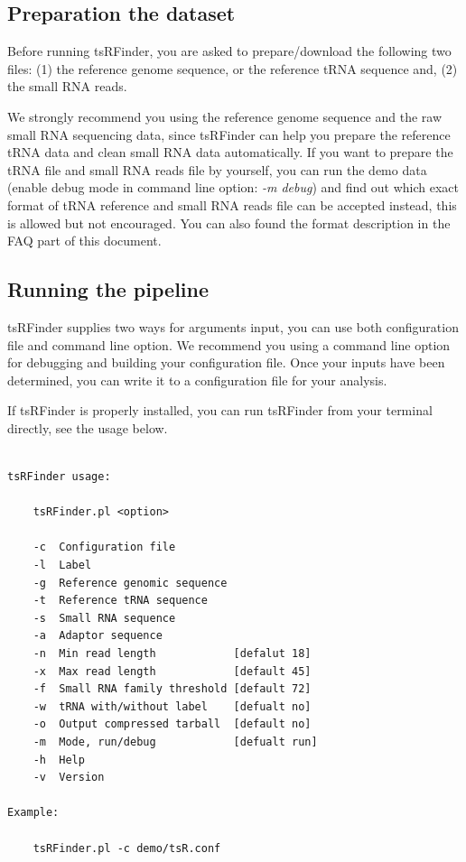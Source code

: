 \documentclass[11pt, a4paper]{article}
\begin{document}
\subsection{Preparation the dataset}

Before running tsRFinder, you are asked to prepare/download the following two files: (1) the reference genome sequence, or the reference tRNA sequence and, (2) the small RNA reads.

We strongly recommend you using the reference genome sequence and the raw small RNA sequencing data, since tsRFinder can help you prepare the reference tRNA data and clean small RNA data automatically. If you want to prepare the tRNA file and small RNA reads file by yourself, you can run the demo data (enable debug mode in command line option: \emph{-m debug}) and find out which exact format of tRNA reference and small RNA reads file can be accepted instead, this is allowed but not encouraged. You can also found the format description in the FAQ part of this document.

\subsection{Running the pipeline}

tsRFinder supplies two ways for arguments input, you can use both configuration file and command line option. We recommend you using a command line option for debugging and building your configuration file. Once your inputs have been determined, you can write it to a configuration file for your analysis.

If tsRFinder is properly installed, you can run tsRFinder from your terminal directly, see the usage below.

{\footnotesize \begin{tcolorbox}[colback=blue!5!white,colframe=blue!75!black,title=Usage of tsRFinder: ./tsRFinder.pl -h]
\begin{verbatim}

tsRFinder usage:

    tsRFinder.pl <option>

    -c  Configuration file
    -l  Label
    -g  Reference genomic sequence
    -t  Reference tRNA sequence
    -s  Small RNA sequence
    -a  Adaptor sequence
    -n  Min read length            [defalut 18]
    -x  Max read length            [default 45]
    -f  Small RNA family threshold [default 72]
    -w  tRNA with/without label    [defualt no]
    -o  Output compressed tarball  [default no]
    -m  Mode, run/debug            [defualt run]
    -h  Help
    -v  Version

Example:

    tsRFinder.pl -c demo/tsR.conf
\end{verbatim}
\end{tcolorbox}}
\end{document}
